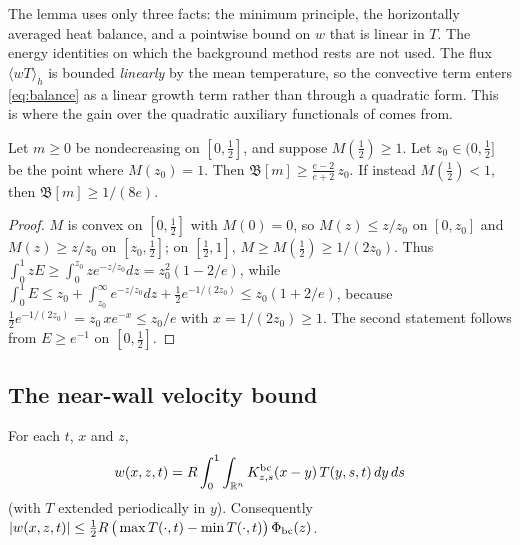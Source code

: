 The lemma uses only three facts: the minimum principle, the horizontally averaged heat balance, and a
pointwise bound on $w$ that is linear in $T$. The energy identities on which the background method rests are
not used. The flux $\langle wT\rangle_h$ is bounded \emph{linearly} by the mean temperature, so the convective
term enters \eqref{eq:balance} as a linear growth term rather than through a quadratic form. This is where the
gain over the quadratic auxiliary functionals of \citet{ArslanRojas2025} comes from.

\begin{lemma}\label{lem:ratio}
Let $m\ge0$ be nondecreasing on $[0,\tfrac12]$, and suppose $M(\tfrac12)\ge1$. Let $z_0\in(0,\tfrac12]$ be
the point where $M(z_0)=1$. Then $\mathfrak B[m]\ge\frac{e-2}{e+2}\,z_0$. If instead $M(\tfrac12)<1$, then
$\mathfrak B[m]\ge1/(8e)$.
\end{lemma}

\begin{proof}
$M$ is convex on $[0,\tfrac12]$ with $M(0)=0$, so $M(z)\le z/z_0$ on $[0,z_0]$ and $M(z)\ge z/z_0$ on
$[z_0,\tfrac12]$; on $[\tfrac12,1]$, $M\ge M(\tfrac12)\ge 1/(2z_0)$. Thus
$\int_0^1zE\ge\int_0^{z_0}ze^{-z/z_0}dz=z_0^2(1-2/e)$, while
$\int_0^1E\le z_0+\int_{z_0}^\infty e^{-z/z_0}dz+\tfrac12e^{-1/(2z_0)}\le z_0(1+2/e)$, because
$\tfrac12e^{-1/(2z_0)}=z_0\,xe^{-x}\le z_0/e$ with $x=1/(2z_0)\ge1$. The second statement follows from
$E\ge e^{-1}$ on $[0,\tfrac12]$.
\end{proof}

\subsection{The near-wall velocity bound}

\begin{lemma}[representation]\label{lem:rep}
For each $t$, $x$ and $z$,
\[
w(x,z,t)=R\int_0^1\int_{\mathbb R^n}K^{\rm bc}_{z,s}(x-y)\,T(y,s,t)\,dy\,ds
\]
(with $T$ extended periodically in $y$). Consequently
$|w(x,z,t)|\le\tfrac12R\,\big(\max T(\cdot,t)-\min T(\cdot,t)\big)\,\Phi_{\rm bc}(z)$.
\end{lemma}

